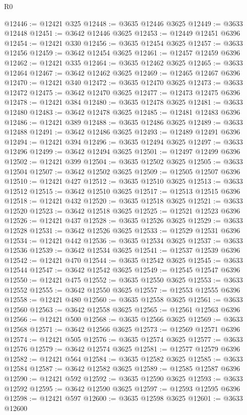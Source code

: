 \begin{lexlean}{R0}
\begin{coremodule}
@12446 := @12421 @325
@12448 := @3635 @12446 @3625
@12449 := @3633 @12448
@12451 := @3642 @12446 @3625
@12453 := @12449 @12451 @6396
@12454 := @12421 @330
@12456 := @3635 @12454 @3625
@12457 := @3633 @12456
@12459 := @3642 @12454 @3625
@12461 := @12457 @12459 @6396
@12462 := @12421 @335
@12464 := @3635 @12462 @3625
@12465 := @3633 @12464
@12467 := @3642 @12462 @3625
@12469 := @12465 @12467 @6396
@12470 := @12421 @340
@12472 := @3635 @12470 @3625
@12473 := @3633 @12472
@12475 := @3642 @12470 @3625
@12477 := @12473 @12475 @6396
@12478 := @12421 @384
@12480 := @3635 @12478 @3625
@12481 := @3633 @12480
@12483 := @3642 @12478 @3625
@12485 := @12481 @12483 @6396
@12486 := @12421 @389
@12488 := @3635 @12486 @3625
@12489 := @3633 @12488
@12491 := @3642 @12486 @3625
@12493 := @12489 @12491 @6396
@12494 := @12421 @394
@12496 := @3635 @12494 @3625
@12497 := @3633 @12496
@12499 := @3642 @12494 @3625
@12501 := @12497 @12499 @6396
@12502 := @12421 @399
@12504 := @3635 @12502 @3625
@12505 := @3633 @12504
@12507 := @3642 @12502 @3625
@12509 := @12505 @12507 @6396
@12510 := @12421 @427
@12512 := @3635 @12510 @3625
@12513 := @3633 @12512
@12515 := @3642 @12510 @3625
@12517 := @12513 @12515 @6396
@12518 := @12421 @432
@12520 := @3635 @12518 @3625
@12521 := @3633 @12520
@12523 := @3642 @12518 @3625
@12525 := @12521 @12523 @6396
@12526 := @12421 @437
@12528 := @3635 @12526 @3625
@12529 := @3633 @12528
@12531 := @3642 @12526 @3625
@12533 := @12529 @12531 @6396
@12534 := @12421 @442
@12536 := @3635 @12534 @3625
@12537 := @3633 @12536
@12539 := @3642 @12534 @3625
@12541 := @12537 @12539 @6396
@12542 := @12421 @470
@12544 := @3635 @12542 @3625
@12545 := @3633 @12544
@12547 := @3642 @12542 @3625
@12549 := @12545 @12547 @6396
@12550 := @12421 @475
@12552 := @3635 @12550 @3625
@12553 := @3633 @12552
@12555 := @3642 @12550 @3625
@12557 := @12553 @12555 @6396
@12558 := @12421 @480
@12560 := @3635 @12558 @3625
@12561 := @3633 @12560
@12563 := @3642 @12558 @3625
@12565 := @12561 @12563 @6396
@12566 := @12421 @500
@12568 := @3635 @12566 @3625
@12569 := @3633 @12568
@12571 := @3642 @12566 @3625
@12573 := @12569 @12571 @6396
@12574 := @12421 @505
@12576 := @3635 @12574 @3625
@12577 := @3633 @12576
@12579 := @3642 @12574 @3625
@12581 := @12577 @12579 @6396
@12582 := @12421 @564
@12584 := @3635 @12582 @3625
@12585 := @3633 @12584
@12587 := @3642 @12582 @3625
@12589 := @12585 @12587 @6396
@12590 := @12421 @592
@12592 := @3635 @12590 @3625
@12593 := @3633 @12592
@12595 := @3642 @12590 @3625
@12597 := @12593 @12595 @6396
@12598 := @12421 @597
@12600 := @3635 @12598 @3625
@12601 := @3633 @12600

\end{coremodule}
\end{lexlean}
